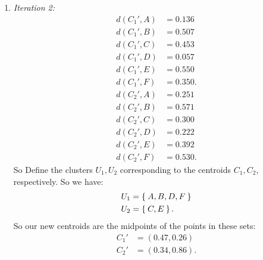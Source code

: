 \documentclass[12pt,oneside,reqno]{amsart}
\theoremstyle{plain}
\theoremstyle{definition}
\theoremstyle{remark}
\newcommand{\bee}{\begin{equation}\begin{aligned}}
\newcommand{\eee}{\end{aligned}\end{equation}}
\begin{document}
\begin{enumerate}[label=\arabic*.]
\begin{enumerate}
\item \textit{Iteration 2:}
\bee
d(C_1',A) &= 0.136\\
d(C_1',B) &= 0.507\\
d(C_1',C) &= 0.453\\
d(C_1',D) &= 0.057\\
d(C_1',E) &= 0.550\\
d(C_1',F) &= 0.350.
\eee
\bee
d(C_2',A) &= 0.251\\
d(C_2',B) &= 0.571\\
d(C_2',C) &= 0.300\\
d(C_2',D) &= 0.222\\
d(C_2',E) &= 0.392\\
d(C_2',F) &= 0.530.
\eee
So Define the clusters $U_1,U_2$ corresponding to the centroids $C_1,C_2$, respectively. So we have:
\bee
U_1 &= \Set{A,B,D,F}\\
U_2 &= \Set{C,E}.
\eee
So our new centroids are the midpoints of the points in these sets:
\bee
C_1' &= (0.47,0.26)\\
C_2' &= (0.34,0.86).
\eee
\end{enumerate}

\end{enumerate}
\end{document}
